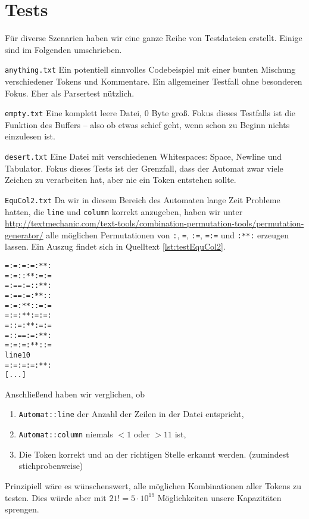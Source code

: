\documentclass[
a4paper,   %
11pt,      %
oneside,   %
onecolumn, %
final      %
]{article}
\newcommand{\code}[1]{\lstinline$#1$}
\begin{document}
\section{Tests}
Für diverse Szenarien haben wir eine ganze Reihe von Testdateien erstellt. Einige sind im Folgenden umschrieben.

\begin{description}
\item{\texttt{anything.txt}} Ein potentiell sinnvolles Codebeispiel mit einer bunten Mischung verschiedener Tokens und Kommentare. Ein allgemeiner Testfall ohne besonderen Fokus. Eher als Parsertest nützlich.

\item{\texttt{empty.txt}} Eine komplett leere Datei, 0 Byte groß. Fokus dieses Testfalls ist die Funktion des Buffers -- also ob etwas schief geht, wenn schon zu Beginn nichts einzulesen ist.

\item{\texttt{desert.txt}} Eine Datei mit verschiedenen Whitespaces: Space, Newline und Tabulator. Fokus dieses Tests ist der Grenzfall, dass der Automat zwar viele Zeichen zu verarbeiten hat, aber nie ein Token entstehen sollte.

\item{\texttt{EquCol2.txt}} Da wir in diesem Bereich des Automaten lange Zeit Probleme hatten, die \code{line} und \code{column} korrekt anzugeben, haben wir unter \url{http://textmechanic.com/text-tools/combination-permutation-tools/permutation-generator/} alle möglichen Permutationen von \texttt{:}, \texttt{=}, \texttt{:=}, \texttt{=:=} und \texttt{:**:} erzeugen lassen.
Ein Auszug findet sich in Quelltext \ref{lst:testEquCol2}.

\begin{lstlisting}[language=SysProgLang, caption={EquCol2.txt}, label=lst:testEquCol2]
=:=:=:=:**:
=:=::**:=:=
=:==:=::**:
=:==:=:**::
=:=:**::=:=
=:=:**:=:=:
=::=:**:=:=
=::==:=:**:
=:=:=:**::=
line10
=:=:=:=:**: 
[...]
\end{lstlisting}
Anschließend haben wir verglichen, ob
\begin{enumerate}
\item \code{Automat::line} der Anzahl der Zeilen in der Datei entspricht,
\item \code{Automat::column} niemals $< 1$ oder $> 11$ ist,
\item Die Token korrekt und an der richtigen Stelle erkannt werden. (zumindest stichprobenweise)
\end{enumerate}
Prinzipiell wäre es wünschenswert, alle möglichen Kombinationen aller Tokens zu testen. Dies würde aber mit $21! = 5 \cdot 10^{19}$ Möglichkeiten unsere Kapazitäten sprengen.


\end{description}
\end{document}
